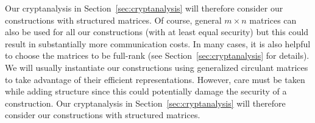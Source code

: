 Our cryptanalysis in Section~\ref{sec:cryptanalysis} will therefore consider our constructions with structured matrices. Of course, general $m \times n$ matrices can also be used for all our constructions (with at least equal security) but this could result in substantially more communication costs. In many cases, it is also helpful to choose the matrices to be full-rank (see Section~\ref{sec:cryptanalysis} for details).
\else
We will usually instantiate our constructions using generalized circulant matrices to take advantage of their efficient representations. However, care must be taken while adding structure since this could potentially damage the security of a construction. Our cryptanalysis in Section~\ref{sec:cryptanalysis} will therefore consider our constructions with structured matrices.
\fi








